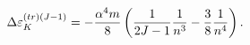 \begin{equation}
\Delta \varepsilon _{K}^{(tr)(J-1)}=-\frac{\alpha ^{4}m}{8}\left( \frac{1}{%
2J-1}\frac{1}{n^{3}}-\frac{3}{8}\frac{1}{n^{4}}\right) .
\end{equation}

